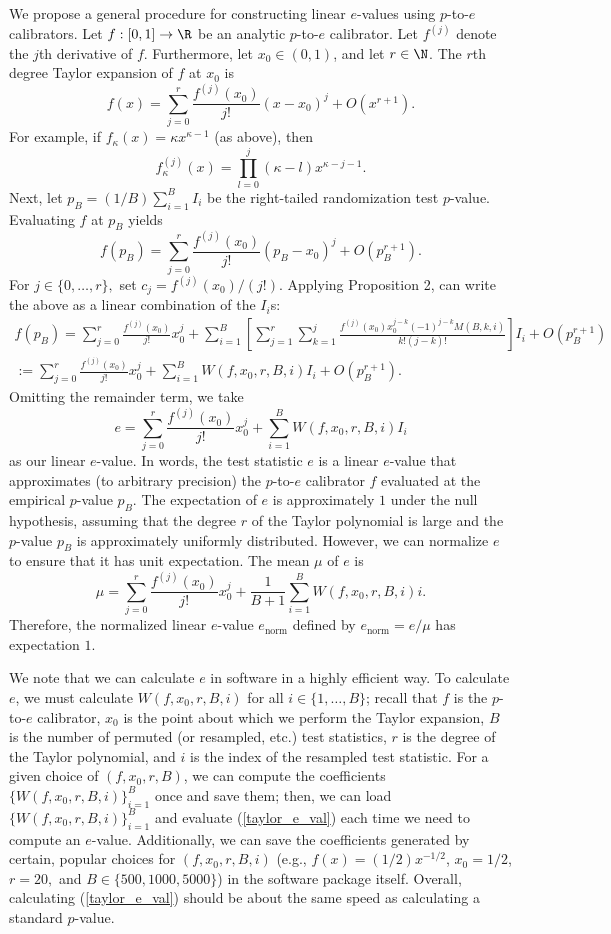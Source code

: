 \documentclass[12pt]{article}
\begin{document}
We propose a general procedure for constructing linear $e$-values using $p$-to-$e$ calibrators. Let $f:[0,1] \to \R$ be an analytic $p$-to-$e$ calibrator. Let $f^{(j)}$ denote the $j$th derivative of $f$. Furthermore, let $x_0 \in (0,1)$, and let $r \in \N$. The $r$th degree Taylor expansion of $f$ at $x_0$ is
$$f(x) = \sum_{j=0}^r \frac{f^{(j)}(x_0)}{j!}(x-x_0)^j + O(x^{r+1}).$$ For example, if $f_\kappa(x) = \kappa x^{\kappa - 1}$ (as above), then
$$f^{(j)}_\kappa(x) = \prod_{l=0}^j(\kappa - l) x^{\kappa-j-1}.$$ Next, let $p_B = (1/B) \sum_{i=1}^B  I_i$ be the right-tailed randomization test $p$-value. Evaluating $f$ at $p_B$ yields
$$f(p_B) = \sum_{j=0}^r \frac{ f^{(j)}(x_0) }{j!} (p_B - x_0)^j + O(p_B^{r+1}).$$ For $j \in \{0, \dots, r\},$ set $c_j = f^{(j)}(x_0)/(j!).$ Applying Proposition 2, can write the above as a linear combination of the $I_i$s:
\begin{multline*}
f(p_B) = \sum_{j=0}^r \frac{f^{(j)}(x_0)}{j!} x_0^j + \sum_{i=1}^B \left[\sum_{j=1}^r \sum_{k=1}^j  \frac{f^{(j)}(x_0) x_0^{j-k} (-1)^{j-k} M(B,k,i) }{k!(j-k)!} \right] I_i + O(p_B^{r+1})  \\ := \sum_{j=0}^r \frac{f^{(j)}(x_0)}{j!} x_0^j  + \sum_{i=1}^B W(f,x_0,r,B,i) I_i + O(p^{r + 1}_B).
\end{multline*}
Omitting the remainder term, we take
\begin{equation}\label{taylor_e_val}
e = \sum_{j=0}^r \frac{f^{(j)}(x_0)}{j!} x^j_0 + \sum_{i=1}^B  W(f,x_0,r,B,i) I_i
\end{equation}
 as our linear $e$-value. In words, the test statistic $e$ is a linear $e$-value that approximates (to arbitrary precision) the $p$-to-$e$ calibrator $f$ evaluated at the empirical $p$-value $p_B$. The expectation of $e$ is approximately $1$ under the null hypothesis, assuming that the degree $r$ of the Taylor polynomial is large and the $p$-value $p_B$ is approximately uniformly distributed. However, we can normalize $e$ to ensure that it has unit expectation. The mean $\mu$ of $e$ is
$$ \mu = \sum_{j=0}^r \frac{f^{(j)}(x_0)}{j!}x_0^j  + \frac{1}{B+1} \sum_{i=1}^B W(f,x_0,r,B,i) i.$$ Therefore, the normalized linear $e$-value $e_\textrm{norm}$ defined by $e_\textrm{norm} = e/\mu$ has expectation $1$. 

We note that we can calculate $e$ in software in a highly efficient way. To calculate $e$, we must calculate $W(f,x_0,r,B,i)$ for all $i \in \{1, \dots, B\}$; recall that $f$ is the $p$-to-$e$ calibrator, $x_0$ is the point about which we perform the Taylor expansion, $B$ is the number of permuted (or resampled, etc.) test statistics, $r$ is the degree of the Taylor polynomial, and $i$ is the index of the resampled test statistic. For a given choice of $(f, x_0, r, B)$, we can compute the coefficients $\{ W(f, x_0, r, B, i) \}_{i=1}^B$ once and save them; then, we can load $\{ W(f, x_0, r, B, i) \}_{i=1}^B$ and evaluate (\ref{taylor_e_val}) each time we need to compute an $e$-value. Additionally, we can save the coefficients generated by certain, popular choices for $(f, x_0, r, B, i)$ (e.g., $f(x) = (1/2)x^{-1/2}$, $x_0 = 1/2$, $r = 20,$ and $B  \in \{500, 1000, 5000\}$) in the software package itself. Overall, calculating (\ref{taylor_e_val}) should be about the same speed as calculating a standard $p$-value.
\end{document}
